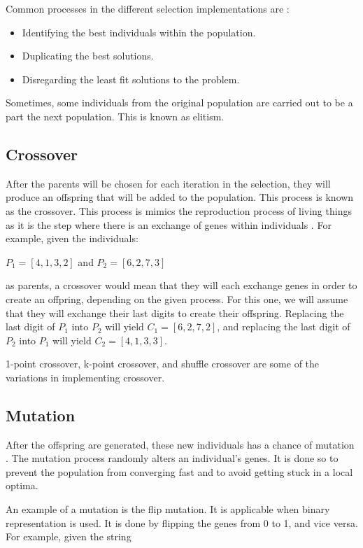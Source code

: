 Common processes in the different selection implementations are \cite{yadav2017comparative}: \par 
\begin{itemize}
	\item Identifying the best individuals within the population.
	\item Duplicating the best solutions.
	\item Disregarding the least fit solutions to the problem.
\end{itemize}

Sometimes, some individuals from the original population are carried out to be a part the next population\cite{maad2016genetic}. This is known as elitism.

\subsection{Crossover}
\indent \indent After the parents will be chosen for each iteration in the selection, they will produce an offspring that will be added to the population. This process is known as the crossover. This process is mimics the reproduction process of living things as it is the step where there is an exchange of genes within individuals \cite{srinivas1994genetic}. For example, given the individuals: \par 
$P_1=[4,1,3,2]$ and $P_2=[6,2,7,3]$ \par 
as parents, a crossover would mean that they will each exchange genes in order to create an offpring, depending on the given process. For this one, we will assume that they will exchange their last digits to create their offspring. Replacing the last digit of $P_1$ into $P_2$ will yield $C_1=[6,2,7,2]$, and replacing the last digit of $P_2$ into $P_1$ will yield $C_2=[4,1,3,3]$. \par 

1-point crossover, k-point crossover, and shuffle crossover are some of the variations in implementing crossover.

\subsection{Mutation}
\indent \indent After the offspring are generated, these new individuals has a chance of mutation \cite{gen2007genetic} \cite{grefenstette1986optimization}. The mutation process randomly alters an individual's genes. It is done so to prevent the population from converging fast and to avoid getting stuck in a local optima. \par An example of a mutation is the flip mutation. It is applicable when binary representation is used. It is done by flipping the genes from 0 to 1, and vice versa. For example, given the string

